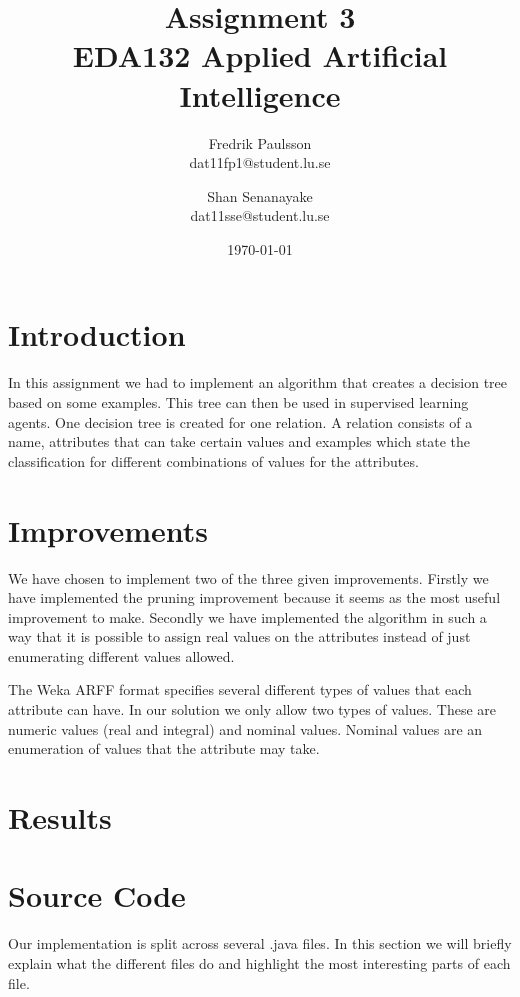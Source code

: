 \documentclass[a4paper]{article}
\title{Assignment 3 \\ EDA132 Applied Artificial Intelligence}
\date{\today}
\author{Fredrik Paulsson \\ dat11fp1@student.lu.se
\and Shan Senanayake \\ dat11sse@student.lu.se}
\begin{document}
\maketitle




\section{Introduction}
In this assignment we had to implement an algorithm that creates a decision tree based on some examples. This tree can then be used in supervised learning agents. One decision tree is created for one relation. A relation consists of a name, attributes that can take certain values and examples which state the classification for different combinations of values for the attributes.

\section{Improvements}
We have chosen to implement two of the three given improvements. Firstly we have implemented the pruning improvement because it seems as the most useful improvement to make. Secondly we have implemented the algorithm in such a way that it is possible to assign real values on the attributes instead of just enumerating different values allowed.

The Weka ARFF format specifies several different types of values that each attribute can have. In our solution we only allow two types of values. These are numeric values (real and integral) and nominal values. Nominal values are an enumeration of values that the attribute may take.

\section{Results}

\section{Source Code}
Our implementation is split across several .java files. In this section we will briefly explain what the different files do and highlight the most interesting parts of each file.
\end{document}
